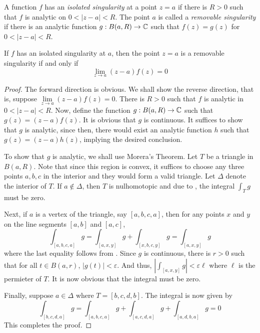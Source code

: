 \begin{definition}
    A function $f$ has an \textit{isolated singularity} at a point $z = a$ if there is $R > 0$ such that $f$ is analytic on $0 < |z - a| < R$. The point $a$ is called a \textit{removable singularity} if there is an analytic function $g: B(a,R)\to\mathbb{C}$ such that $f(z) = g(z)$ for $0 < |z - a| < R$.
\end{definition}

\begin{theorem}
    If $f$ has an isolated singularity at $a$, then the point $z = a$ is a removable singularity if and only if 
    \begin{equation*}
        \lim_{z\to a}(z - a)f(z) = 0
    \end{equation*}
\end{theorem}
\begin{proof}
    The forward direction is obvious. We shall show the reverse direction, that is, suppose $\lim\limits_{z\to a}(z - a)f(z) = 0$. There is $R > 0$ such that $f$ is analytic in $0 < |z - a| < R$. Now, define the function $g: B(a,R)\to\mathbb{C}$ such that $g(z) = (z - a)f(z)$. It is obvious that $g$ is continuous. It suffices to show that $g$ is analytic, since then, there would exist an analytic function $h$ such that $g(z) = (z - a)h(z)$, implying the desired conclusion.

    To show that $g$ is analytic, we shall use Morera's Theorem. Let $T$ be a triangle in $B(a,R)$. Note that since this region is convex, it suffices to choose any three points $a,b,c$ in the interior and they would form a valid triangle. Let $\Delta$ denote the interior of $T$. If $a\notin\Delta$, then $T$ is nulhomotopic and due to , the integral $\int_T g$ must be zero. 

    Next, if $a$ is a vertex of the triangle, say $[a,b,c,a]$, then for any points $x$ and $y$ on the line segments $[a,b]$ and $[a,c]$, 
    \begin{equation*}
        \int_{[a,b,c,a]} g = \int_{[a,x,y]} g + \int_{[x,b,c,y]} g = \int_{[a,x,y]} g
    \end{equation*}
    where the last equality follows from . Since $g$ is continuous, there is $r > 0$ such that for all $t\in B(a,r)$, $|g(t)| < \varepsilon$. And thus, $|\int_{[a,x,y]} g| < \varepsilon\ell$ where $\ell$ is the permieter of $T$. It is now obvious that the integral must be zero. 

    Finally, suppose $a\in\Delta$ where $T = [b,c,d,b]$. The integral is now given by 
    \begin{equation*}
        \int_{[b,c,d,a]}g = \int_{[a,b,c,a]}g + \int_{[a,c,d,a]}g + \int_{[a,d,b,a]} g = 0
    \end{equation*}
    This completes the proof.
\end{proof}

